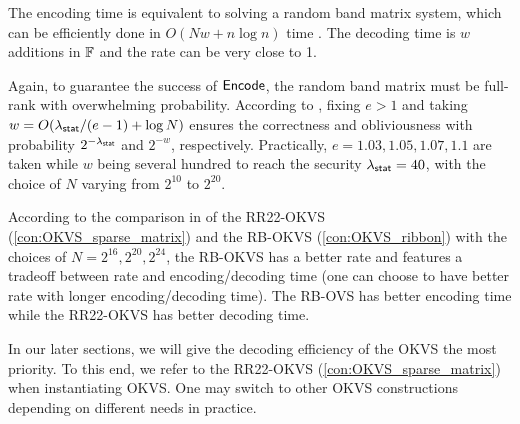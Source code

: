 The encoding time is equivalent to solving a random band matrix system, which can be efficiently done in $O(Nw+n\log n)$ time \cite{cryptoeprint:2023/903}. The decoding time is $w$ additions in $\mathbb{F}$ and the rate can be very close to 1. 

Again, to guarantee the success of ${\sf Encode}$, the random band matrix must be full-rank with overwhelming probability. According to \cite{cryptoeprint:2023/903}, fixing $e>1$ and taking $w = O(\lambda_{\sf stat}/(e-1)+\log N)$ ensures the correctness and obliviousness with probability $2^{-\lambda_{\sf stat}}$ and $2^{-w}$, respectively. Practically, $e=1.03,1.05,1.07,1.1$ are taken while $w$ being several hundred to reach the security $\lambda_{\sf stat}=40$, with the choice of $N$ varying from $2^{10}$ to $2^{20}$. 

According to the comparison in \cite{cryptoeprint:2023/903} of the RR22-OKVS (\cref{con:OKVS_sparse_matrix}) and the RB-OKVS (\cref{con:OKVS_ribbon}) with the choices of $N = 2^{16}, 2^{20}, 2^{24}$, the RB-OKVS has a better rate and features a tradeoff between rate and encoding/decoding time (one can choose to have better rate with longer encoding/decoding time). The RB-OVS has better encoding time while the RR22-OKVS has better decoding time. 


\medskip

In our later sections, we will give the decoding efficiency of the OKVS the most priority. To this end, we refer to the RR22-OKVS (\cref{con:OKVS_sparse_matrix}) when instantiating OKVS. One may switch to other OKVS constructions depending on different needs in practice. 
